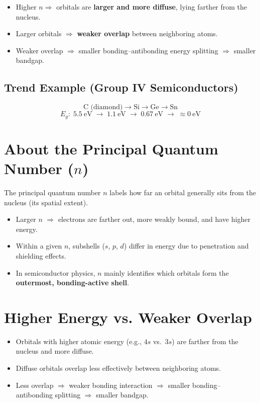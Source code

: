 \documentclass[12pt]{article}
\begin{document}
	\begin{itemize}
		\item Higher $n \Rightarrow$ orbitals are \textbf{larger and more diffuse}, lying farther from the nucleus.
		\item Larger orbitals $\Rightarrow$ \textbf{weaker overlap} between neighboring atoms.
		\item Weaker overlap $\Rightarrow$ smaller bonding--antibonding energy splitting $\Rightarrow$ smaller bandgap.
	\end{itemize}
	
	\subsection*{Trend Example (Group IV Semiconductors)}
	\[
	\text{C (diamond)} \rightarrow \text{Si} \rightarrow \text{Ge} \rightarrow \text{Sn}
	\]
	\[
	E_g: \; 5.5~\text{eV} \; \rightarrow \; 1.1~\text{eV} \; \rightarrow \; 0.67~\text{eV} \; \rightarrow \; \approx 0~\text{eV}
	\]
	
	\section{About the Principal Quantum Number ($n$)}
	The principal quantum number $n$ labels how far an orbital generally sits from the nucleus (its spatial extent).
	
	\begin{itemize}
		\item Larger $n$ $\Rightarrow$ electrons are farther out, more weakly bound, and have higher energy.
		\item Within a given $n$, subshells ($s$, $p$, $d$) differ in energy due to penetration and shielding effects.
		\item In semiconductor physics, $n$ mainly identifies which orbitals form the \textbf{outermost, bonding-active shell}.
	\end{itemize}
	
	\section{Higher Energy vs. Weaker Overlap}
	\begin{itemize}
		\item Orbitals with higher atomic energy (e.g., $4s$ vs.\ $3s$) are farther from the nucleus and more diffuse.
		\item Diffuse orbitals overlap less effectively between neighboring atoms.
		\item Less overlap $\Rightarrow$ weaker bonding interaction $\Rightarrow$ smaller bonding--antibonding splitting $\Rightarrow$ smaller bandgap.
	\end{itemize}
	
\end{document}

